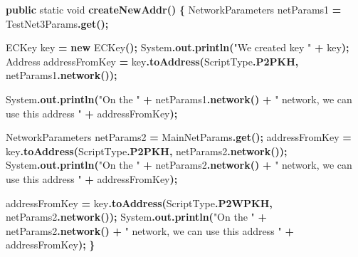 \documentclass[
  italian,
  openany]{book}
\newenvironment{Shaded}{\begin{snugshade}}{\end{snugshade}}
\newcommand{\BuiltInTok}[1]{#1}
\newcommand{\DataTypeTok}[1]{\textcolor[rgb]{0.13,0.29,0.53}{#1}}
\newcommand{\FunctionTok}[1]{\textcolor[rgb]{0.13,0.29,0.53}{\textbf{#1}}}
\newcommand{\KeywordTok}[1]{\textcolor[rgb]{0.13,0.29,0.53}{\textbf{#1}}}
\newcommand{\NormalTok}[1]{#1}
\newcommand{\OperatorTok}[1]{\textcolor[rgb]{0.81,0.36,0.00}{\textbf{#1}}}
\newcommand{\StringTok}[1]{\textcolor[rgb]{0.31,0.60,0.02}{#1}}
\begin{document}
\begin{Shaded}
\begin{Highlighting}[]
\KeywordTok{public} \DataTypeTok{static} \DataTypeTok{void} \FunctionTok{createNewAddr}\OperatorTok{()} \OperatorTok{\{}
\NormalTok{    NetworkParameters netParams1 }\OperatorTok{=}\NormalTok{ TestNet3Params}\OperatorTok{.}\FunctionTok{get}\OperatorTok{();}

    \BuiltInTok{ECKey}\NormalTok{ key }\OperatorTok{=} \KeywordTok{new} \BuiltInTok{ECKey}\OperatorTok{();}
    \BuiltInTok{System}\OperatorTok{.}\FunctionTok{out}\OperatorTok{.}\FunctionTok{println}\OperatorTok{(}\StringTok{"We created key "} \OperatorTok{+}\NormalTok{ key}\OperatorTok{);}
\NormalTok{    Address addressFromKey }\OperatorTok{=}\NormalTok{ key}\OperatorTok{.}\FunctionTok{toAddress}\OperatorTok{(}\NormalTok{ScriptType}\OperatorTok{.}\FunctionTok{P2PKH}\OperatorTok{,}\NormalTok{ netParams1}\OperatorTok{.}\FunctionTok{network}\OperatorTok{());}

    \BuiltInTok{System}\OperatorTok{.}\FunctionTok{out}\OperatorTok{.}\FunctionTok{println}\OperatorTok{(}\StringTok{"On the "} \OperatorTok{+}\NormalTok{ netParams1}\OperatorTok{.}\FunctionTok{network}\OperatorTok{()} \OperatorTok{+}
        \StringTok{" network, we can use this address "} \OperatorTok{+}\NormalTok{ addressFromKey}\OperatorTok{);}

\NormalTok{    NetworkParameters netParams2 }\OperatorTok{=}\NormalTok{ MainNetParams}\OperatorTok{.}\FunctionTok{get}\OperatorTok{();}
\NormalTok{    addressFromKey }\OperatorTok{=}\NormalTok{ key}\OperatorTok{.}\FunctionTok{toAddress}\OperatorTok{(}\NormalTok{ScriptType}\OperatorTok{.}\FunctionTok{P2PKH}\OperatorTok{,}\NormalTok{ netParams2}\OperatorTok{.}\FunctionTok{network}\OperatorTok{());}
    \BuiltInTok{System}\OperatorTok{.}\FunctionTok{out}\OperatorTok{.}\FunctionTok{println}\OperatorTok{(}\StringTok{"On the "} \OperatorTok{+}\NormalTok{ netParams2}\OperatorTok{.}\FunctionTok{network}\OperatorTok{()} \OperatorTok{+}
        \StringTok{" network, we can use this address "} \OperatorTok{+}\NormalTok{ addressFromKey}\OperatorTok{);}

\NormalTok{    addressFromKey }\OperatorTok{=}\NormalTok{ key}\OperatorTok{.}\FunctionTok{toAddress}\OperatorTok{(}\NormalTok{ScriptType}\OperatorTok{.}\FunctionTok{P2WPKH}\OperatorTok{,}\NormalTok{ netParams2}\OperatorTok{.}\FunctionTok{network}\OperatorTok{());}
    \BuiltInTok{System}\OperatorTok{.}\FunctionTok{out}\OperatorTok{.}\FunctionTok{println}\OperatorTok{(}\StringTok{"On the "} \OperatorTok{+}\NormalTok{ netParams2}\OperatorTok{.}\FunctionTok{network}\OperatorTok{()} \OperatorTok{+}
        \StringTok{" network, we can use this address "} \OperatorTok{+}\NormalTok{ addressFromKey}\OperatorTok{);}
\OperatorTok{\}}
\end{Highlighting}
\end{Shaded}
\end{document}
